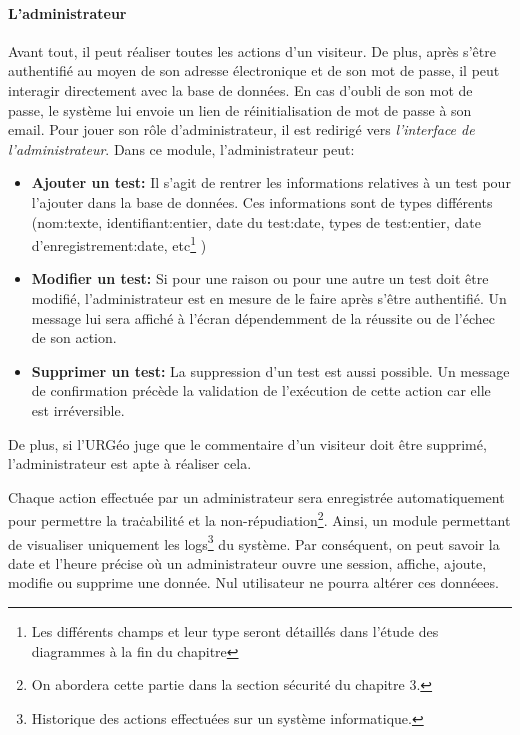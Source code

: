         \paragraph{L'administrateur}
        Avant tout, il peut réaliser toutes les actions d'un visiteur. De plus, après s'être authentifié au moyen de 
        son adresse électronique et de son mot de passe, il peut interagir directement avec la base de données. En cas 
        d'oubli de son mot de passe, le système lui envoie un lien de réinitialisation de mot de passe à son email.
        Pour jouer son rôle d'administrateur, il est redirigé vers \textit{l'interface de l'administrateur}. 
        Dans ce module, l'administrateur peut:
        \begin{itemize}
                \item \textbf{Ajouter un test: }
                Il s'agit de rentrer les informations relatives à un test pour l'ajouter dans la base de données.
                Ces informations sont de types différents (nom:texte, identifiant:entier, date du test:date, types
                de test:entier, date d'enregistrement:date, etc\footnote{Les différents champs et leur type seront 
                détaillés dans l'étude des diagrammes à la fin du chapitre} )
                \item \textbf{Modifier un test: }
                Si pour une raison ou pour une autre un test doit être modifié, l'administrateur est en
                mesure de le faire après s'être authentifié. Un message lui sera affiché à l'écran dépendemment 
                de la réussite ou de l'échec de son action.
                \item \textbf{Supprimer un test: }
                La suppression d'un test est aussi possible. Un message de confirmation précède la validation
                de l'exécution de cette action car elle est irréversible.
        \end{itemize}
        \par
        De plus, si l'URGéo juge que le commentaire d'un visiteur doit être supprimé,
        l'administrateur est apte à réaliser cela.
        \par
        Chaque action effectuée par un administrateur sera enregistrée automatiquement pour permettre la traċabilité
        et la non-répudiation\footnote{On abordera cette partie dans la section sécurité du chapitre 3.}.
        Ainsi, un module permettant de visualiser uniquement les logs\footnote{Historique des actions effectuées sur un système informatique.} du système. Par conséquent, on peut savoir
        la date et l'heure précise où un administrateur ouvre une session, affiche, ajoute, modifie ou supprime une donnée.
        Nul utilisateur ne pourra altérer ces donnéees.
        \par

